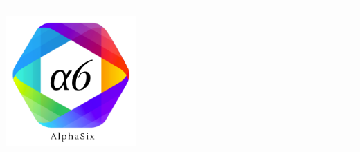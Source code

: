 \begin{center}

\begin{large} \textbf{\progetto} \end{large}
\vspace{0.2em}

\hrule
\vspace{3.5em}

\includegraphics[keepaspectratio = true, width=5cm]{../template/icons/a6.png}


\thispagestyle{empty}

\vspace{1.5em}

\begin{center} 
  \begin{Huge}
  {\fontsize{15mm}{20mm}\selectfont \gruppoLink} 
  \end{Huge}
\end{center}

\vfill

\begin{Huge} \documento \end{Huge}


\end{center}
